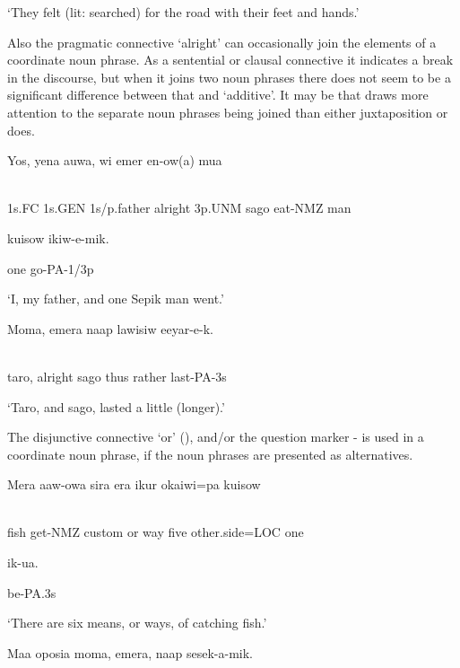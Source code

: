 `They felt (lit: searched) for the road with their feet and hands.'

Also the pragmatic connective  `alright' can occasionally join the elements of a coordinate noun phrase. As a sentential or clausal connective it indicates a break in the discourse, but when it joins two noun phrases there does not seem to be a significant difference between that and  `additive'. It may be that  draws more attention to the separate noun phrases being joined than either juxtaposition or  does.

\ea%
\label{ex:x815}
\gll Yos,  yena  auwa,    wi  emer  en-ow(a)  mua  \\
      \\
\glt
\z

1s.FC  1s.GEN  1s/p.father  alright  3p.UNM  sago  eat-NMZ  man

kuisow  ikiw-e-mik.

one  go-PA-1/3p

`I, my father, and one Sepik man went.'

\ea%
\label{ex:x816}
\gll Moma,    emera  naap  lawisiw  eeyar-e-k. \\
      \\
\glt
\z

taro,  alright  sago  thus  rather  last-PA-3s

`Taro, and sago, lasted a little (longer).'

The disjunctive connective  `or' (), and/or the question marker -  is used in a coordinate noun phrase, if the noun phrases are presented as alternatives. 

\ea%
\label{ex:x817}
\gll Mera  aaw-owa  sira    era  ikur  okaiwi=pa  kuisow  \\
      \\
\glt
\z

fish  get-NMZ  custom  or  way  five  other.side=LOC  one  

ik-ua.

be-PA.3s

`There are six means, or ways, of catching fish.'

\ea%
\label{ex:x818}
\gll Maa  oposia moma,  emera,  naap  sesek-a-mik. \\
      \\
\glt
\z

